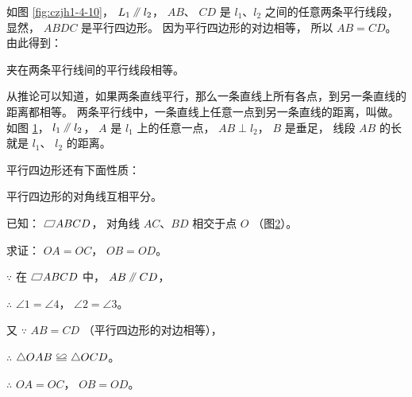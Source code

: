 如图 \ref{fig:czjh1-4-10}， $L_1 \pingxing l_2$， $AB$、 $CD$ 是 $l_1$、$l_2$ 之间的任意两条平行线段，
显然， $ABDC$ 是平行四边形。 因为平行四边形的对边相等， 所以 $AB = CD$。 由此得到：

\begin{tuilun}[推论]
    夹在两条平行线间的平行线段相等。
\end{tuilun}

\begin{figure}[htbp]
    \centering
    \begin{minipage}[b]{7cm}
        \centering
        
        \caption{}\label{fig:czjh1-4-10}
    \end{minipage}
    \qquad
    \begin{minipage}[b]{7cm}
        \centering
        
        \caption{}\label{fig:czjh1-4-11}
    \end{minipage}
\end{figure}


从推论可以知道，如果两条直线平行，那么一条直线上所有各点，到另一条直线的距离都相等。
两条平行线中，一条直线上任意一点到另一条直线的距离，叫做。
如图 \ref{fig:czjh1-4-11}， $l_1 \pingxing l_2$，  $A$ 是 $l_1$ 上的任意一点， $AB \perp l_2$，
$B$ 是垂足， 线段 $AB$ 的长就是 $l_1$、 $l_2$ 的距离。

平行四边形还有下面性质：

\begin{dingli}[平行四边形性质定理3]
    平行四边形的对角线互相平分。
\end{dingli}

\begin{figure}
    \centering
    
    \caption{}\label{fig:czjh1-4-12}
\end{figure}


已知： $\pxsbx ABCD$， 对角线 $AC$、$BD$ 相交于点 $O$ （图\ref{fig:czjh1-4-12}）。

求证： $OA = OC$， $OB = OD$。

\zhengming $\because$ \quad 在 $\pxsbx ABCD$ 中， $AB \pingxing CD$，

$\therefore$ \quad $\angle 1 = \angle 4$， $\angle 2 = \angle 3$。

又 $\because$ \quad $AB = CD$ （平行四边形的对边相等），

$\therefore$ \quad $\triangle OAB \quandeng \triangle OCD$。

$\therefore$ \quad $OA = OC$， $OB = OD$。

